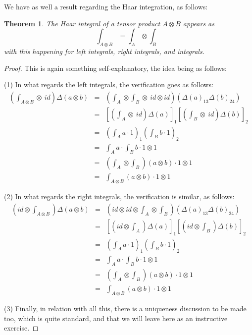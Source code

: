 \documentclass[12pt]{amsbook}
\newtheorem{theorem}{Theorem}[chapter]
\begin{document}
We have as well a result regarding the Haar integration, as follows:

\begin{theorem}
The Haar integral of a tensor product $A\otimes B$ appears as
$$\int_{A\otimes B}=\int_A\otimes\int_B$$
with this happening for left integrals, right integrals, and integrals.
\end{theorem}

\begin{proof}
This is again something self-explanatory, the idea being as follows:

\medskip

(1) In what regards the left integrals, the verification goes as follows:
\begin{eqnarray*}
\left(\int_{A\otimes B}\otimes\  id\right)\Delta(a\otimes b)
&=&\left(\int_A\otimes\int_B\otimes\ id\otimes id\right)(\Delta(a)_{13}\Delta(b)_{24})\\
&=&\left[\left(\int_A\otimes\ id\right)\Delta(a)\right]_1\left[\left(\int_B\otimes\ id\right)\Delta(b)\right]_2\\
&=&\left(\int_Aa\cdot 1\right)_1\left(\int_Bb\cdot 1\right)_2\\
&=&\int_Aa\cdot\int_Bb\cdot 1\otimes 1\\
&=&\left(\int_A\otimes\int_B\right)(a\otimes b)\cdot 1\otimes 1\\
&=&\int_{A\otimes B}(a\otimes b)\cdot 1\otimes 1
\end{eqnarray*}

(2) In what regards the right integrals, the verification is similar, as follows:
\begin{eqnarray*}
\left(id\otimes\int_{A\otimes B}\right)\Delta(a\otimes b)
&=&\left(id\otimes id\otimes\int_A\otimes\int_B\right)(\Delta(a)_{13}\Delta(b)_{24})\\
&=&\left[\left(id\otimes\int_A\right)\Delta(a)\right]_1\left[\left(id\otimes\int_B\right)\Delta(b)\right]_2\\
&=&\left(\int_Aa\cdot 1\right)_1\left(\int_Bb\cdot 1\right)_2\\
&=&\int_Aa\cdot\int_Bb\cdot 1\otimes 1\\
&=&\left(\int_A\otimes\int_B\right)(a\otimes b)\cdot 1\otimes 1\\
&=&\int_{A\otimes B}(a\otimes b)\cdot 1\otimes 1
\end{eqnarray*}

(3) Finally, in relation with all this, there is a uniqueness discussion to be made too, which is quite standard, and that we will leave here as an instructive exercise.
\end{proof}
\end{document}
